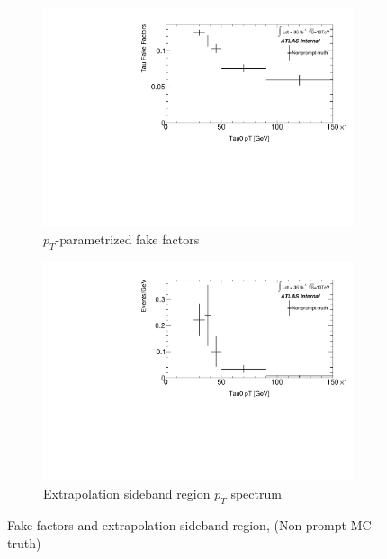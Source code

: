 \documentclass[11pt]{article}
\begin{document}
	\begin{figure}[H]
	\centering
	\begin{subfigure}{.5\textwidth}
	\centering
	\includegraphics[width=0.95\linewidth]{figures/FakesEstimate_data_pp8_nonallhad_new_scaledHists/FF_Faketau_Nonprompt-truth.pdf}
  	\caption{$p_T$-parametrized fake factors}
  	\label{fig:sub1}
	\end{subfigure}%
	\begin{subfigure}{.5\textwidth}
	\centering
	\includegraphics[width=0.95\linewidth]{figures/FakesEstimate_data_pp8_nonallhad_new_scaledHists/hist_Extrapolation_Nonprompt-truth.pdf}
	\caption{Extrapolation sideband region $p_T$ spectrum}
	\end{subfigure}
	\caption{Fake factors and extrapolation sideband region, (Non-prompt MC - truth)}
	\end{figure}
	
\end{document}
